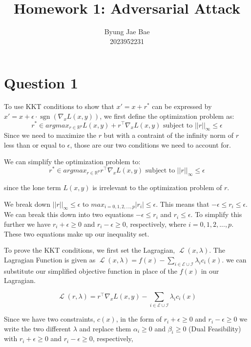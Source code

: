 \documentclass{article}
\title{Homework 1: Adversarial Attack}
\author{Byung Jae Bae\\2023952231}
\DeclareMathOperator{\sgn}{sgn}
\DeclareMathOperator{\Lagr}{\mathcal{L}}
\begin{document}
\maketitle
\section{Question 1}

To use KKT conditions to show that $x\prime = x + r^\ast$ 
can be expressed by $x\prime = x + \epsilon \cdot \sgn(\nabla_{x}L(x,y))$, 
we first define the optimization problem as:
\begin{equation}
    r^\ast \in argmax_{r \in \mathbb{R}^p} L(x,y) + r^\intercal \nabla_{x} L(x,y) \text{ subject to }  ||r||_\infty \le \epsilon
\end{equation}
Since we need to maximize the $r$ but with a contraint of the infinity norm of $r$ less than or equal to $\epsilon$, 
those are our two conditions we need to account for. 

We can simplify the optimization problem to:
\begin{equation}
    r^\ast \in argmax_{r \in \mathbb{R}^p} r^\intercal \nabla_{x} L(x,y) \text{ subject to }  ||r||_\infty \le \epsilon
\end{equation}

since the lone term $ L(x,y) $ is irrelevant to the optimization problem of $ r $.

We break down $ ||r||_\infty \le \epsilon $ to $ max_{i = 0, 1, 2, ... , p}|r_i| \le \epsilon $. 
This means that $ -\epsilon \le r_{i} \le \epsilon $. We can break this down into two equations $ -\epsilon \le r_{i} $ and $ r_{i} \le \epsilon $. 
To simplify this further we have $ r_{i}+\epsilon \ge 0 $ and $r_{i}-\epsilon \ge 0 $, respectively, where $ i = 0, 1, 2, ..., p $. These two equations make up our inequality set.

To prove the KKT conditions, we first set the Lagragian, $\Lagr(x,\lambda)$.
The Lagragian Function is given as $\Lagr(x,\lambda) = f(x) - \sum_{i \in \mathcal{E} \cup \mathcal{I}}\lambda_{i}c_{i}(x)$.
we can substitute our simplified objective function in place of the $f(x)$ in our Lagragian. 

\begin{equation}
    \Lagr(r,\lambda) = r^\intercal \nabla_{x} L(x,y) - \sum_{i \in \mathcal{E} \cup \mathcal{I}}\lambda_{i}c_{i}(x)
\end{equation}

Since we have two constraints, $c(x)$, in the form of $ r_{i}+\epsilon \ge 0 $ and $r_{i}-\epsilon \ge 0 $ we write the two different $\lambda$ and replace them $ \alpha_{i} \ge 0 $ and $ \beta_{i} \ge 0 $ (Dual Feasibility) with $ r_{i} + \epsilon \ge 0 $ and $ r_{i} - \epsilon \ge 0 $, respectively, 
\end{document}
